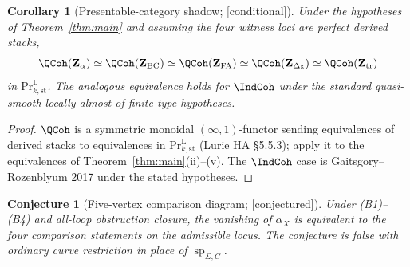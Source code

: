 \documentclass[11pt,reqno]{amsart}
\theoremstyle{plain}
\newtheorem{corollary}[theorem]{Corollary}
\newtheorem{conjecture}[theorem]{Conjecture}
\theoremstyle{definition}
\theoremstyle{remark}
\providecommand{\ClaimStatusConjectured}{\textnormal{[conjectured]}}
\providecommand{\ClaimStatusConditional}{\textnormal{[conditional]}}
\begin{document}
\begin{corollary}[Presentable-category shadow; \ClaimStatusConditional]
\label{cor:prl-shadow-anomaly-loci}
Under the hypotheses of Theorem~\ref{thm:main} and assuming the four
witness loci are perfect derived stacks,
\[
  \QCoh(\mathbf Z_\alpha)
  \simeq\QCoh(\mathbf Z_{\mathrm{BC}})
  \simeq\QCoh(\mathbf Z_{\mathrm{FA}})
  \simeq\QCoh(\mathbf Z_{\Delta_5})
  \simeq\QCoh(\mathbf Z_{\mathrm{tr}})
\]
in $\mathrm{Pr}^{\mathrm L}_{k,\mathrm{st}}$. The analogous
equivalence holds for $\IndCoh$ under the standard quasi-smooth
locally almost-of-finite-type hypotheses.
\end{corollary}

\begin{proof}
$\QCoh$ is a symmetric monoidal $(\infty,1)$-functor sending
equivalences of derived stacks to equivalences in
$\mathrm{Pr}^{\mathrm L}_{k,\mathrm{st}}$ (Lurie $\mathrm{HA}$
\S5.5.3); apply it to the equivalences of
Theorem~\ref{thm:main}\textup{(ii)--(v)}. The $\IndCoh$ case is
Gaitsgory--Rozenblyum 2017 under the stated hypotheses.
\end{proof}

\begin{conjecture}[Five-vertex comparison diagram; \ClaimStatusConjectured]
\label{conj:atiyah-connes-pentagon}
Under \textup{(B1)--(B4)} and all-loop obstruction closure, the
vanishing of $\alpha_X$ is equivalent to the four comparison statements on
the admissible locus. The conjecture is false with ordinary curve
restriction in place of $\operatorname{sp}_{\Sigma,C}$.
\end{conjecture}
\end{document}
